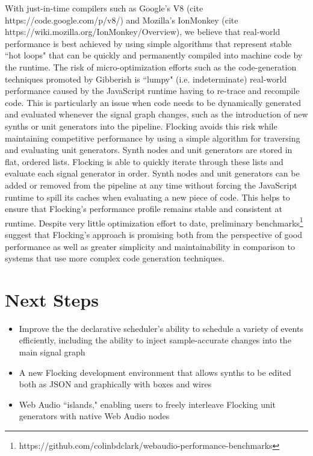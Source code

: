 \documentclass{article}
\begin{document}
With just-in-time compilers such as Google's V8 (cite https://code.google.com/p/v8/) and Mozilla's IonMonkey (cite https://wiki.mozilla.org/IonMonkey/Overview), we believe that real-world performance is best achieved by using simple algorithms that represent stable ``hot loops" that can be quickly and permanently  compiled into machine code by the runtime. The risk of micro-optimization efforts such as the code-generation techniques promoted by Gibberish is ``lumpy" (i.e. indeterminate) real-world performance caused by the JavaScript runtime having to re-trace and recompile code. This is particularly an issue when code needs to be dynamically generated and evaluated whenever the signal graph changes, such as the introduction of new synths or unit generators into the pipeline. Flocking avoids this risk while maintaining competitive performance by using a simple algorithm for traversing and evaluating unit generators. Synth nodes and unit generators are stored in flat, ordered lists. Flocking is able to quickly iterate through these lists and evaluate each signal generator in order. Synth nodes and unit generators can be added or removed from the pipeline at any time without forcing the JavaScript runtime to spill its caches when evaluating a new piece of code. This helps to ensure that Flocking's performance profile remains stable and consistent at runtime. Despite very little optimization effort to date, preliminary benchmarks\footnote{https://github.com/colinbdclark/webaudio-performance-benchmarks} suggest that Flocking's approach is promising both from the perspective of good performance as well as greater simplicity and maintainability in comparison to systems that use more complex code generation techniques.

\section{Next Steps}

\begin{itemize}
  \item Improve the the declarative scheduler's ability to schedule a variety of events efficiently, including the ability to inject sample-accurate changes into the main signal graph
  \item A new Flocking development environment that allows synths to be edited both as JSON and graphically with boxes and wires
  \item Web Audio ``islands," enabling users to freely interleave Flocking unit generators with native Web Audio nodes
\end{itemize}
\end{document}
